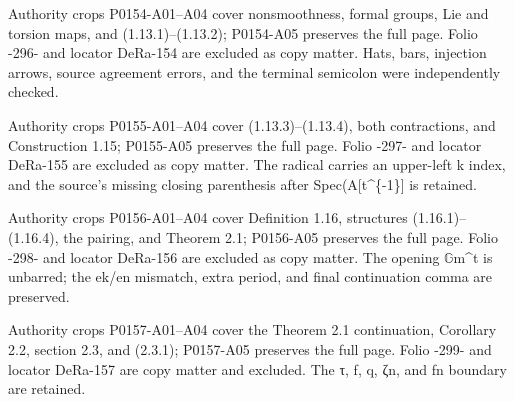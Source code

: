 \documentclass[11pt,a4paper]{article}
\begin{document}
\par\medskip
\hypertarget{D018-P0154}{}
\par\smallskip
Authority crops P0154-A01--A04 cover nonsmoothness, formal groups, Lie and torsion maps, and (1.13.1)--(1.13.2); P0154-A05 preserves the full page. Folio -296- and locator DeRa-154 are excluded as copy matter. Hats, bars, injection arrows, source agreement errors, and the terminal semicolon were independently checked.


\par\medskip
\hypertarget{D018-P0155}{}
\par\smallskip
Authority crops P0155-A01--A04 cover (1.13.3)--(1.13.4), both contractions, and Construction 1.15; P0155-A05 preserves the full page. Folio -297- and locator DeRa-155 are excluded as copy matter. The radical carries an upper-left k index, and the source's missing closing parenthesis after Spec(A[t\textasciicircum{}\{-1\}] is retained.


\par\medskip
\hypertarget{D018-P0156}{}
\par\smallskip
Authority crops P0156-A01--A04 cover Definition 1.16, structures (1.16.1)--(1.16.4), the pairing, and Theorem 2.1; P0156-A05 preserves the full page. Folio -298- and locator DeRa-156 are excluded as copy matter. The opening \ensuremath{\mathbb{G}}\textunderscore{}m\textasciicircum{}t is unbarred; the e\textunderscore{}k/e\textunderscore{}n mismatch, extra period, and final continuation comma are preserved.


\par\medskip
\hypertarget{D018-P0157}{}
\par\smallskip
Authority crops P0157-A01--A04 cover the Theorem 2.1 continuation, Corollary 2.2, section 2.3, and (2.3.1); P0157-A05 preserves the full page. Folio -299- and locator DeRa-157 are copy matter and excluded. The τ, f, q, ζ\textunderscore{}n, and f\textunderscore{}n boundary are retained.
\end{document}
